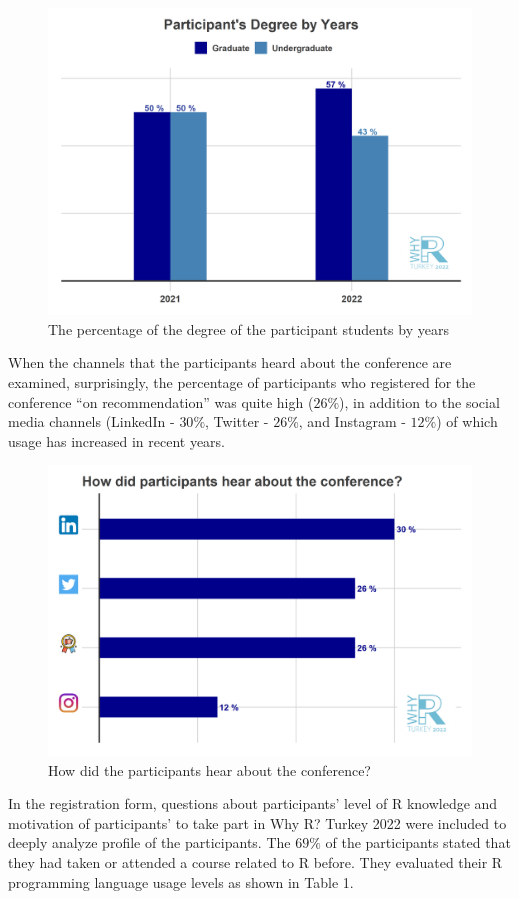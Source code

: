 \begin{figure}

{\centering \includegraphics[width=0.6\linewidth]{figure2} 

}

\caption{The percentage of the degree of the participant students by years}\label{fig:unnamed-chunk-1}
\end{figure}

When the channels that the participants heard about the conference are examined, surprisingly, the percentage of participants who registered for the conference ``on recommendation'' was quite high (\(26\%\)), in addition to the social media channels (LinkedIn - \(30\%\), Twitter - \(26\%\), and Instagram - \(12\%\)) of which usage has increased in recent years.

\begin{figure}

{\centering \includegraphics[width=0.6\linewidth]{figure3} 

}

\caption{How did the participants hear about the conference?}\label{fig:unnamed-chunk-2}
\end{figure}

In the registration form, questions about participants' level of R knowledge and motivation of participants' to take part in Why R? Turkey 2022 were included to deeply analyze profile of the participants. The \(69\%\) of the participants stated that they had taken or attended a course related to R before. They evaluated their R programming language usage levels as shown in Table 1.


